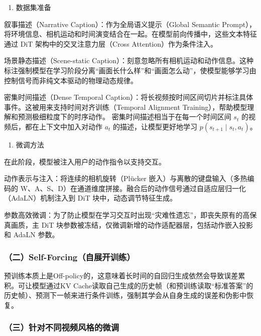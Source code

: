 \begin{enumerate}
\def\labelenumi{\arabic{enumi}.}
\tightlist
\item
  数据集准备
\end{enumerate}

叙事描述（Narrative Caption）：作为全局语义提示（Global Semantic Prompt），将环境信息、相机运动和时间演变结合在一起。在模型前向传播中，这些文本特征通过 DiT 架构中的交叉注意力层（Cross Attention）作为条件注入。

场景静态描述（Scene-static Caption）：刻意忽略所有相机运动和动作信息。这种标注强制模型在学习阶段分离``画面长什么样''和``画面怎么动''，使模型能够学习由控制信号而非纯文本驱动的物理动态规律。

密集时间描述（Dense Temporal Caption）：将长视频按时间区间切片并标注具体事件。这被用来支持时间对齐训练（Temporal Alignment Training），帮助模型理解和预测极细粒度下的时序动作。
密集时间描述相当于在每一个时间区间 \(s_t\) 的视频后，都在上下文中加入对动作 \(a_t\) 的描述，让模型更好地学习 \(p(s_{t+1}\mid s_t,a_t)\)。

\begin{enumerate}
\def\labelenumi{\arabic{enumi}.}
\setcounter{enumi}{1}
\tightlist
\item
  微调方法
\end{enumerate}

在此阶段，模型被注入用户的动作指令以支持交互。

动作表示与注入：将连续的相机旋转（Plücker 嵌入）与离散的键盘输入（多热编码的 W、A、S、D）在通道维度拼接。融合后的动作信号通过自适应层归一化（AdaLN）机制注入到 DiT 块中，动态调节特征生成。

参数高效微调：为了防止模型在学习交互时出现``灾难性遗忘''，即丧失原有的高保真画质，主 DiT 块参数被冻结，仅微调新增的动作适配器层，包括动作嵌入投影和 AdaLN 参数。

\hypertarget{ux4e8cself-forcingux81eaux5c55ux5f00ux8badux7ec3}{%
\subsubsection{（二）Self-Forcing（自展开训练）}\label{ux4e8cself-forcingux81eaux5c55ux5f00ux8badux7ec3}}

预训练本质上是Off-policy的，这意味着长时间的自回归生成依然会导致误差累积。可让模型通过KV Cache读取自己生成的历史帧（和预训练读取``标准答案''的历史帧）、预测下一帧来进行条件训练，强制其学会从自身生成的误差和伪影中恢复。

\hypertarget{ux4e09ux9488ux5bf9ux4e0dux540cux89c6ux9891ux98ceux683cux7684ux5faeux8c03}{%
\subsubsection{（三）针对不同视频风格的微调}\label{ux4e09ux9488ux5bf9ux4e0dux540cux89c6ux9891ux98ceux683cux7684ux5faeux8c03}}

